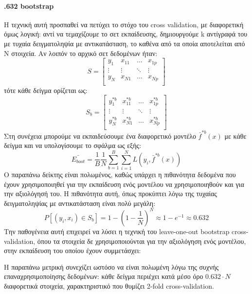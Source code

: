 \paragraph{.632 bootstrap} Η τεχνική αυτή προσπαθεί να πετύχει το στόχο του cross validation, με διαφορετική όμως λογική: αντί να τεμαχίζουμε το σετ εκπαίδευσης, δημιουργούμε k αντίγραφά του με τυχαία δειγματοληψία με αντικατάσταση, το καθένα από τα οποία αποτελείται από Ν στοιχεία. Αν λοιπόν το αρχικό σετ δεδομένων ήταν:
\begin{equation}
S=
\begin{bmatrix}
y_1 &  x_{11}  & \dots  &   x_{1p} \\
\vdots  & \vdots &\ddots & \vdots \\
y_N &  x_{N1}  & \dots  &   x_{Np} \\
\end{bmatrix}
\end{equation}
τότε κάθε δείγμα ορίζεται ως:
\begin{equation}
S_b=
\begin{bmatrix}
y_1^{*b} &  x_{11}^{*b}  & \dots  &   x_{1p}^{*b} \\
\vdots  & \vdots &\ddots & \vdots \\
y_N^{*b} &  x_{N1}^{*b}  & \dots  &   x_{Np}^{*b} \\
\end{bmatrix}
\end{equation}
Στη συνέχεια μπορούμε να εκπαιδεύσουμε ένα διαφορετικό μοντέλο $\bar{f}^{*b}(x)$ με κάθε δείγμα και να υπολογίσουμε το σφάλμα ως εξής:
\begin{equation}
\bar{E_{boot}}=\frac{1}{B} \frac{1}{N} \sum_{b=1}^{B} \sum_{i=1}^{N} L(y_i,\bar{f}^{*b}(x))
\end{equation}
Ο παραπάνω δείκτης είναι πολωμένος, καθώς υπάρχει η πιθανότητα δεδομένα που έχουν χρησιμοποιηθεί για την εκπαίδευση ενός μοντέλου να χρησιμοποιηθούν και για την αξιολόγησή του. Η πιθανότητα αυτή, όπως προκύπτει λόγω της τυχαίας δειγματοληψίας με αντικατάσταση είναι πολύ μεγάλη:
\begin{equation}
P[(y_i, x_i) \in S_b]= 1- (1- \frac{1}{N})^N \approx 1- e^{-1} \approx 0.632
\end{equation}
Την παθογένεια αυτή επιχειρεί να λύσει η τεχνική του leave-one-out bootstrap cross-validation, όπου τα στοιχεία δε χρησιμοποιούνται για την αξιολόγηση ενός μοντέλου, στην εκπαίδευση του οποίου έχουν συμμετάσχει:

Η παραπάνω μετρική συνεχίζει ωστόσο να είναι πολωμένη λόγω της συχνής επαναχρησιμοποίησης δεδομένων: κάθε δείγμα  περιέχει κατά μέσο όρο $0.632 \cdot N$ διαφορετικά στοιχεία, χαρακτηριστικό που θυμίζει 2-fold cross-validation.

